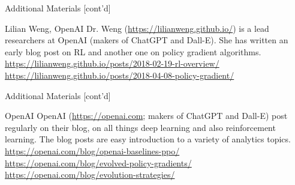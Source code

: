 \documentclass[ignorenonframetext,xcolor=x11names]{beamer}
\begin{document}
\begin{frame}[label=full]{Additional Materials \small [cont'd]}
\footnotesize
\begin{block}{Lilian Weng, OpenAI}
Dr. Weng (\url{https://lilianweng.github.io/}) is a lead researchers at OpenAI (makers of ChatGPT and Dall-E). She has written an early blog post on RL and another one on policy gradient algorithms. \\
\vspace{.5\baselineskip}
\url{https://lilianweng.github.io/posts/2018-02-19-rl-overview/}\\
\vspace{.5\baselineskip}
\url{https://lilianweng.github.io/posts/2018-04-08-policy-gradient/}
\end{block}
\end{frame}

\begin{frame}[label=full]{Additional Materials \small [cont'd]}
\footnotesize
\begin{block}{OpenAI}
OpenAI (\url{https://openai.com}; makers of ChatGPT and Dall-E) post regularly on their blog, on all things deep learning and also reinforcement learning. The blog posts are easy introduction to a variety of analytics topics. \\
\vspace{.5\baselineskip}
\url{https://openai.com/blog/openai-baselines-ppo/} \\
\vspace{.5\baselineskip}
\url{https://openai.com/blog/evolved-policy-gradients/} \\
\vspace{.5\baselineskip}
\url{https://openai.com/blog/evolution-strategies/}
\end{block}

\end{frame}
\end{document}
